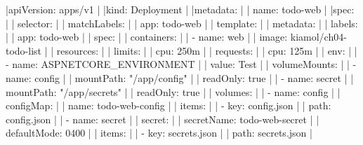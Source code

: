 \beginlines
|apiVersion: apps/v1                           |
|kind: Deployment                              |
|metadata:                                     |
|  name: todo-web                              |
|spec:                                         |
|  selector:                                   |
|    matchLabels:                              |
|      app: todo-web                           |
|  template:                                   |
|    metadata:                                 |
|      labels:                                 |
|        app: todo-web                         |
|    spec:                                     |
|      containers:                             |
|        - name: web                           |
|          image: kiamol/ch04-todo-list        |
|          resources:                          |
|            limits:                           |
|              cpu: 250m                       |
|            requests:                         |
|              cpu: 125m                       |
|          env:                                |
|          - name: ASPNETCORE_ENVIRONMENT      |
|            value: Test                       |
|          volumeMounts:                       |
|            - name: config                    |
|              mountPath: "/app/config"        |
|              readOnly: true                  |
|            - name: secret                    |
|              mountPath: "/app/secrets"       |
|              readOnly: true                  |
|      volumes:                                |
|        - name: config                        |
|          configMap:                          |
|            name: todo-web-config             |
|            items:                            |
|            - key: config.json                |
|              path: config.json               |
|        - name: secret                        |
|          secret:                             |
|            secretName: todo-web-secret       |
|            defaultMode: 0400                 |
|            items:                            |
|            - key: secrets.json               |
|              path: secrets.json              |
\endlines

\bye



